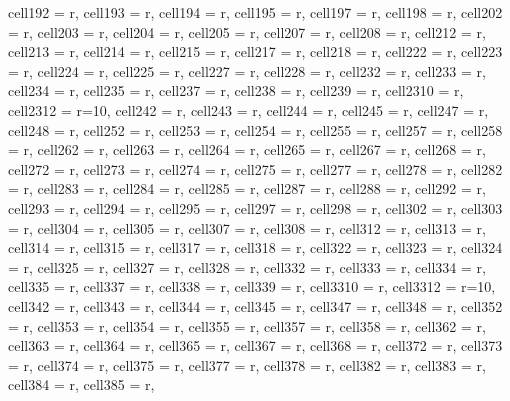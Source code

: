 \begin{longtblr}[
  caption = {Linear model estimating all the considered metrics in every alternative scenario.}
]
{  cell{19}{2} = {r},
  cell{19}{3} = {r},
  cell{19}{4} = {r},
  cell{19}{5} = {r},
  cell{19}{7} = {r},
  cell{19}{8} = {r},
  cell{20}{2} = {r},
  cell{20}{3} = {r},
  cell{20}{4} = {r},
  cell{20}{5} = {r},
  cell{20}{7} = {r},
  cell{20}{8} = {r},
  cell{21}{2} = {r},
  cell{21}{3} = {r},
  cell{21}{4} = {r},
  cell{21}{5} = {r},
  cell{21}{7} = {r},
  cell{21}{8} = {r},
  cell{22}{2} = {r},
  cell{22}{3} = {r},
  cell{22}{4} = {r},
  cell{22}{5} = {r},
  cell{22}{7} = {r},
  cell{22}{8} = {r},
  cell{23}{2} = {r},
  cell{23}{3} = {r},
  cell{23}{4} = {r},
  cell{23}{5} = {r},
  cell{23}{7} = {r},
  cell{23}{8} = {r},
  cell{23}{9} = {r},
  cell{23}{10} = {r},
  cell{23}{12} = {r=10}{},
  cell{24}{2} = {r},
  cell{24}{3} = {r},
  cell{24}{4} = {r},
  cell{24}{5} = {r},
  cell{24}{7} = {r},
  cell{24}{8} = {r},
  cell{25}{2} = {r},
  cell{25}{3} = {r},
  cell{25}{4} = {r},
  cell{25}{5} = {r},
  cell{25}{7} = {r},
  cell{25}{8} = {r},
  cell{26}{2} = {r},
  cell{26}{3} = {r},
  cell{26}{4} = {r},
  cell{26}{5} = {r},
  cell{26}{7} = {r},
  cell{26}{8} = {r},
  cell{27}{2} = {r},
  cell{27}{3} = {r},
  cell{27}{4} = {r},
  cell{27}{5} = {r},
  cell{27}{7} = {r},
  cell{27}{8} = {r},
  cell{28}{2} = {r},
  cell{28}{3} = {r},
  cell{28}{4} = {r},
  cell{28}{5} = {r},
  cell{28}{7} = {r},
  cell{28}{8} = {r},
  cell{29}{2} = {r},
  cell{29}{3} = {r},
  cell{29}{4} = {r},
  cell{29}{5} = {r},
  cell{29}{7} = {r},
  cell{29}{8} = {r},
  cell{30}{2} = {r},
  cell{30}{3} = {r},
  cell{30}{4} = {r},
  cell{30}{5} = {r},
  cell{30}{7} = {r},
  cell{30}{8} = {r},
  cell{31}{2} = {r},
  cell{31}{3} = {r},
  cell{31}{4} = {r},
  cell{31}{5} = {r},
  cell{31}{7} = {r},
  cell{31}{8} = {r},
  cell{32}{2} = {r},
  cell{32}{3} = {r},
  cell{32}{4} = {r},
  cell{32}{5} = {r},
  cell{32}{7} = {r},
  cell{32}{8} = {r},
  cell{33}{2} = {r},
  cell{33}{3} = {r},
  cell{33}{4} = {r},
  cell{33}{5} = {r},
  cell{33}{7} = {r},
  cell{33}{8} = {r},
  cell{33}{9} = {r},
  cell{33}{10} = {r},
  cell{33}{12} = {r=10}{},
  cell{34}{2} = {r},
  cell{34}{3} = {r},
  cell{34}{4} = {r},
  cell{34}{5} = {r},
  cell{34}{7} = {r},
  cell{34}{8} = {r},
  cell{35}{2} = {r},
  cell{35}{3} = {r},
  cell{35}{4} = {r},
  cell{35}{5} = {r},
  cell{35}{7} = {r},
  cell{35}{8} = {r},
  cell{36}{2} = {r},
  cell{36}{3} = {r},
  cell{36}{4} = {r},
  cell{36}{5} = {r},
  cell{36}{7} = {r},
  cell{36}{8} = {r},
  cell{37}{2} = {r},
  cell{37}{3} = {r},
  cell{37}{4} = {r},
  cell{37}{5} = {r},
  cell{37}{7} = {r},
  cell{37}{8} = {r},
  cell{38}{2} = {r},
  cell{38}{3} = {r},
  cell{38}{4} = {r},
  cell{38}{5} = {r},
}
\end{longtblr}
